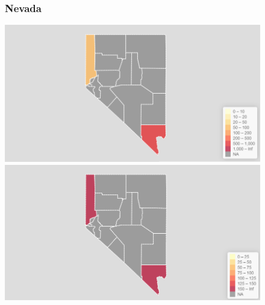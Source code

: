 \documentclass[11pt]{article}
\begin{document}
\begin{landscape}
\begin{figure}[h]
\subsubsection*{Nevada}
\vfill
\hspace*{-3cm}
\begin{minipage}{.8\textwidth}
    \includegraphics[width=.95\textwidth]{ImageResults/NevadaTotal.PNG}
\end{minipage}%
\begin{minipage}{.8\textwidth}
    \includegraphics[width=.95\textwidth]{ImageResults/Nevada100k.PNG}
\end{minipage}
\fillandplacepagenumber
\end{figure}
\end{landscape}
\end{document}

